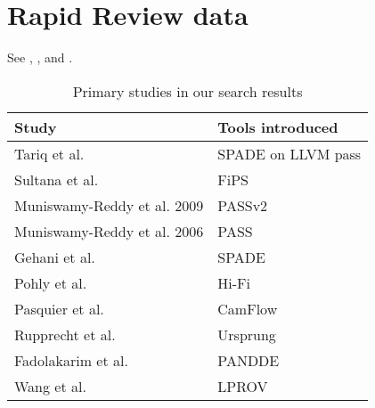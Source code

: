 \appendix

\section{Rapid Review data}

See , , and .

\begin{table}
\caption{Primary studies in our search results}
\label{table:primary-studies}
\begin{tabular}{ll}
Study                                                                    & Tools introduced   \\
\midrule                                                                
Tariq et al. \cite{tariq_towards_2012}                                   & SPADE on LLVM pass \\
Sultana et al. \cite{sultana_file_2013}                                  & FiPS               \\
Muniswamy-Reddy et al. 2009 \cite{muniswamy-reddy_layering_2009}         & PASSv2             \\
Muniswamy-Reddy et al. 2006 \cite{muniswamy-reddy_provenance-aware_2006} & PASS               \\
Gehani et al. \cite{gehani_spade_2012}                                   & SPADE              \\
Pohly et al. \cite{pohly_hi-fi_2012}                                     & Hi-Fi              \\
Pasquier et al. \cite{pasquier_practical_2017}                           & CamFlow            \\
Rupprecht et al. \cite{rupprecht_improving_2020}                         & Ursprung           \\
Fadolakarim et al. \cite{fadolalkarim_pandde_2016}                       & PANDDE             \\
Wang et al. \cite{wang_lprov_2018}                                       & LPROV              \\
\end{tabular}
\end{table}

